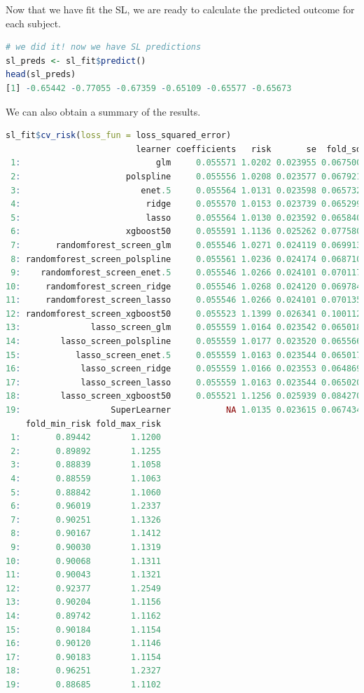 \documentclass[
  12pt, krantz2,
]{krantz}
\theoremstyle{definition}
\theoremstyle{definition}
\theoremstyle{definition}
\newcommand{\1}{\mathbbm{1}}
\begin{document}
Now that we have fit the SL, we are ready to calculate the predicted outcome
for each subject.

\begin{lstlisting}[language=R]
# we did it! now we have SL predictions
sl_preds <- sl_fit$predict()
head(sl_preds)
[1] -0.65442 -0.77055 -0.67359 -0.65109 -0.65577 -0.65673
\end{lstlisting}

We can also obtain a summary of the results.

\begin{lstlisting}[language=R]
sl_fit$cv_risk(loss_fun = loss_squared_error)
                          learner coefficients   risk       se  fold_sd
 1:                           glm     0.055571 1.0202 0.023955 0.067500
 2:                     polspline     0.055556 1.0208 0.023577 0.067921
 3:                        enet.5     0.055564 1.0131 0.023598 0.065732
 4:                         ridge     0.055570 1.0153 0.023739 0.065299
 5:                         lasso     0.055564 1.0130 0.023592 0.065840
 6:                     xgboost50     0.055591 1.1136 0.025262 0.077580
 7:       randomforest_screen_glm     0.055546 1.0271 0.024119 0.069913
 8: randomforest_screen_polspline     0.055561 1.0236 0.024174 0.068710
 9:    randomforest_screen_enet.5     0.055546 1.0266 0.024101 0.070117
10:     randomforest_screen_ridge     0.055546 1.0268 0.024120 0.069784
11:     randomforest_screen_lasso     0.055546 1.0266 0.024101 0.070135
12: randomforest_screen_xgboost50     0.055523 1.1399 0.026341 0.100112
13:              lasso_screen_glm     0.055559 1.0164 0.023542 0.065018
14:        lasso_screen_polspline     0.055559 1.0177 0.023520 0.065566
15:           lasso_screen_enet.5     0.055559 1.0163 0.023544 0.065017
16:            lasso_screen_ridge     0.055559 1.0166 0.023553 0.064869
17:            lasso_screen_lasso     0.055559 1.0163 0.023544 0.065020
18:        lasso_screen_xgboost50     0.055521 1.1256 0.025939 0.084270
19:                  SuperLearner           NA 1.0135 0.023615 0.067434
    fold_min_risk fold_max_risk
 1:       0.89442        1.1200
 2:       0.89892        1.1255
 3:       0.88839        1.1058
 4:       0.88559        1.1063
 5:       0.88842        1.1060
 6:       0.96019        1.2337
 7:       0.90251        1.1326
 8:       0.90167        1.1412
 9:       0.90030        1.1319
10:       0.90068        1.1311
11:       0.90043        1.1321
12:       0.92377        1.2549
13:       0.90204        1.1156
14:       0.89742        1.1162
15:       0.90184        1.1154
16:       0.90120        1.1146
17:       0.90183        1.1154
18:       0.96251        1.2327
19:       0.88685        1.1102
\end{lstlisting}
\end{document}
